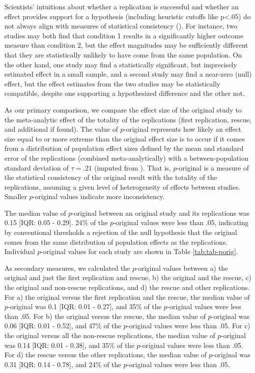 \documentclass[
  english,
  a4paper,
]{article}
\begin{document}
Scientists' intuitions about whether a replication is successful and whether an effect provides support for a hypothesis (including heuristic cutoffs like p\textless.05) do not always align with measures of statistical consistency ().
For instance, two studies may both find that condition 1 results in a significantly higher outcome measure than condition 2, but the effect magnitudes may be sufficiently different that they are statistically unlikely to have come from the same population.
On the other hand, one study may find a statistically significant, but imprecisely estimated effect in a small sample, and a second study may find a near-zero (null) effect, but the effect estimates from the two studies may be statistically compatible, despite one supporting a hypothesized difference and the other not.

As our primary comparison, we compare the effect size of the original study to the meta-analytic effect of the totality of the replications (first replication, rescue, and additional if found).
The value of \(p\)-original represents how likely an effect size equal to or more extreme than the original effect size is to occur if it comes from a distribution of population effect sizes defined by the mean and standard error of the replications (combined meta-analytically) with a between-population standard deviation of \(\tau=.21\) (imputed from ).
That is, \(p\)-original is a measure of the statistical consistency of the original result with the totality of the replications, assuming a given level of heterogeneity of effects between studies.
Smaller \(p\)-original values indicate more inconsistency.

The median value of \(p\)-original between an original study and its replications was 0.15 {[}IQR: 0.05 - 0.29{]}.
24\% of the \(p\)-original values were less than .05, indicating by conventional thresholds a rejection of the null hypothesis that the original comes from the same distribution of population effects as the replications.
Individual \(p\)-original values for each study are shown in Table \ref{tab:tab-porig}.

As secondary measures, we calculated the \(p\)-original values between a) the original and just the first replication and rescue, b) the original and the rescue, c) the original and non-rescue replications, and d) the rescue and other replications.
For a) the original versus the first replication and the rescue, the median value of \(p\)-original was 0.1 {[}IQR: 0.01 - 0.27{]}, and 35\% of the \(p\)-original values were less than .05.
For b) the original versus the rescue, the median value of \(p\)-original was 0.06 {[}IQR: 0.01 - 0.52{]}, and 47\% of the \(p\)-original values were less than .05.
For c) the original versus all the non-rescue replications, the median value of \(p\)-original was 0.14 {[}IQR: 0.01 - 0.38{]}, and 35\% of the \(p\)-original values were less than .05.
For d) the rescue versus the other replications, the median value of \(p\)-original was 0.31 {[}IQR: 0.14 - 0.78{]}, and 24\% of the \(p\)-original values were less than .05.
\end{document}
